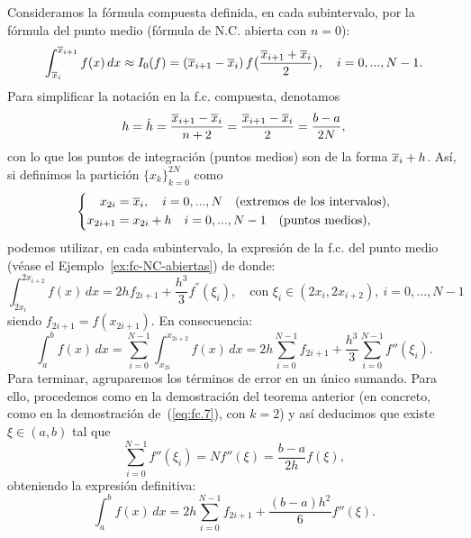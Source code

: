 \begin{example}
  Consideramos la fórmula compuesta definida, en cada subintervalo,
  por la fórmula del punto medio (fórmula de N.C. abierta con $n=0$):
  \begin{equation*}
    \int_{\overline x_{i}}^{\overline x_{i+1}} f(x)\, dx \approx I_0(f)=
    (\overline x_{i+1}-\overline x_{i}) \, f\big(\frac{\overline x_{i+1}+\overline x_{i}} 2 \big), \quad i=0,...,N-1.
  \end{equation*}
  Para simplificar la notación en la f.c. compuesta, denotamos
  $$
  h=\hat h =\frac{\overline x_{i+1}-\overline x_{i}}{n+2}=\frac{\overline x_{i+1}-\overline x_{i}}2 =
  \frac{b-a}{2N},
  $$
  con lo que los puntos de integración (puntos medios) son de la
  forma $\overline x_{i}+h$.
  Así, si definimos la partición $\{x_k\}_{k=0}^{2N}$ como
  \begin{equation*}
    \left\{
      \begin{aligned}
        x_{2i} &= \overline x_i, \quad i=0,...,N \quad \text{(extremos de los
          intervalos)},
        \\
        x_{2i+1} &= x_{2i}+h \quad i=0,...,N-1
        \quad\text{(puntos medios)},
      \end{aligned}
      \right.
    \end{equation*}
  podemos utilizar, en cada subintervalo, la expresión de la f.c. del
  punto medio (véase el Ejemplo~\ref{ex:fc-NC-abiertas}) de donde:
  \begin{equation*}
    \int_{2x_i}^{2x_{i+2}} f(x)\, dx = 
    2hf_{2i+1} +
    \frac{h^3}{3}f^{''}(\xi_i), \quad \text{con }
    \xi_i\in(2x_i,2x_{i+2}),\ i=0,...,N-1
  \end{equation*}
  siendo $f_{2i+1}=f(x_{2i+1})$. En consecuencia:
  \begin{equation*}
    \int_a^b f(x)\,dx = \sum_{i=0}^{N-1} \int_{x_{2i}}^{x_{2i+2}} f(x)\,dx
    = 2h \sum_{i=0}^{N-1} f_{2i+1} + \frac{h^3}{3} \sum_{i=0}^{N-1}f''(\xi_i). 
  \end{equation*}
  Para terminar, agruparemos los términos de error en un único
  sumando. Para ello, procedemos como en la demostración del teorema
  anterior (en concreto, como en la demostración de~(\ref{eq:fc.7}), con
  $k=2$) y así deducimos que existe $\xi\in(a,b)$ tal que
  $$\sum_{i=0}^{N-1}f''(\xi_i)=Nf''(\xi)=\frac{b-a}{2h}f(\xi),$$
  obteniendo la expresión definitiva:
  \begin{equation*}
    \int_a^b f(x)\,dx 
    = 2h \sum_{i=0}^{N-1} f_{2i+1} + \frac{(b-a)h^2}{6} f''(\xi).
  \end{equation*}  
\end{example}

